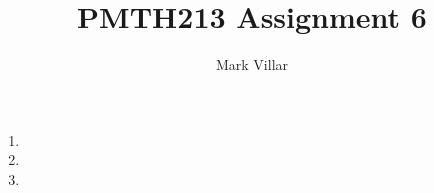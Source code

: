 \documentclass[12pt]{amsart}
\title{PMTH213 \hfill Assignment 6}
\author{Mark Villar}
\begin{document}
 

\maketitle 

\begin{enumerate}
	
	\item
			
	\item 
		
	\item 

\end{enumerate}
\end{document}
